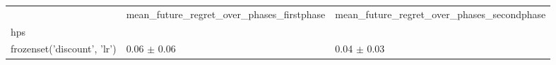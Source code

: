 \begin{tabular}{lll}
\toprule
 & mean_future_regret_over_phases_firstphase & mean_future_regret_over_phases_secondphase \\
hps &  &  \\
\midrule
frozenset({'discount', 'lr'}) & 0.06 $\pm$ 0.06 & 0.04 $\pm$ 0.03 \\
\bottomrule
\end{tabular}
